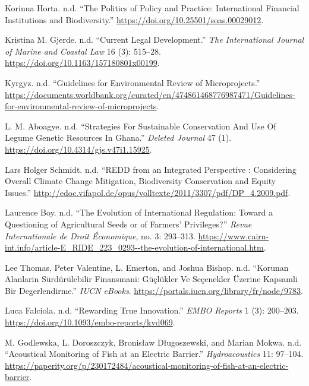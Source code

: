\begin{CSLReferences}{1}{0}
Korinna Horta. n.d. {``The Politics of Policy and Practice:
International Financial Institutions and Biodiversity.''}
\url{https://doi.org/10.25501/soas.00029012}.

Kristina M. Gjerde. n.d. {``Current Legal Development.''} \emph{The
International Journal of Marine and Coastal Law} 16 (3): 515--28.
\url{https://doi.org/10.1163/157180801x00199}.

Kyrgyz. n.d. {``Guidelines for Environmental Review of Microprojects.''}
\url{https://documents.worldbank.org/curated/en/474861468776987471/Guidelines-for-environmental-review-of-microprojects}.

L. M. Aboagye. n.d. {``Strategies For Sustainable Conservation And Use
Of Legume Genetic Resources In Ghana.''} \emph{Deleted Journal} 47 (1).
\url{https://doi.org/10.4314/gjs.v47i1.15925}.

Lars Holger Schmidt. n.d. {``REDD from an Integrated Perspective :
Considering Overall Climate Change Mitigation, Biodiversity Conservation
and Equity Issues.''}
\url{http://edoc.vifapol.de/opus/volltexte/2011/3307/pdf/DP_4.2009.pdf}.

Laurence Boy. n.d. {``The Evolution of International Regulation: Toward
a Questioning of Agricultural Seeds or of Farmers' Privileges?''}
\emph{Revue Internationale de Droit Économique}, no. 3: 293--313.
\url{https://www.cairn-int.info/article-E_RIDE_223_0293--the-evolution-of-international.htm}.

Lee Thomas, Peter Valentine, L. Emerton, and Joshua Bishop. n.d.
{``Korunan Alanlarin Sürdürülebilir Finansmani: Güçlükler Ve Seçenekler
Üzerine Kapsamli Bir Degerlendirme.''} \emph{IUCN eBooks}.
\url{https://portals.iucn.org/library/fr/node/9783}.

Luca Falciola. n.d. {``Rewarding True Innovation.''} \emph{EMBO Reports}
1 (3): 200--203. \url{https://doi.org/10.1093/embo-reports/kvd069}.

M. Godlewska, L. Doroszczyk, Bronisław Długoszewski, and Marian Mokwa.
n.d. {``Acoustical Monitoring of Fish at an Electric Barrier.''}
\emph{Hydroacoustics} 11: 97--104.
\url{https://paperity.org/p/230172484/acoustical-monitoring-of-fish-at-an-electric-barrier}.


\end{CSLReferences}
